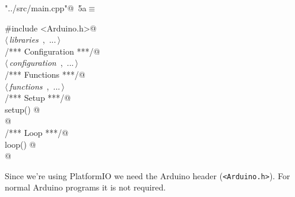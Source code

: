 \documentclass[a4paper, 11pt]{article}
\begin{document}
\begin{flushleft} \small
\begin{minipage}{\linewidth}\label{scrap1}\raggedright\small
{}\verb@"../src/main.cpp"@\nobreak\ {\footnotesize{5a}}$\equiv$
\vspace{-1ex}
\begin{list}{}{\setlength{\leftmargin}{1em}} \item
\mbox{}\lstinline@#include <Arduino.h>@\\
\mbox{}\lstinline@@$\langle\,${\itshape libraries}\ {\footnotesize {}},\ ...\,$\rangle\,$\verb@@\\
\mbox{}\lstinline@/*** Configuration ***/@\\
\mbox{}\lstinline@@$\langle\,${\itshape configuration}\ {\footnotesize {}},\ ...\,$\rangle\,$\verb@@\\
\mbox{}\lstinline@/*** Functions ***/@\\
\mbox{}\lstinline@@$\langle\,${\itshape functions}\ {\footnotesize {}},\ ...\,$\rangle\,$\verb@@\\
\mbox{}\lstinline@/*** Setup ***/@\\
\mbox{}\lstinline@void setup() @\\
\mbox{}@\\
\mbox{}\lstinline@/*** Loop ***/@\\
\mbox{}\lstinline@void loop() @\\
\mbox{}@\\
\mbox{}{\NWsep}
\end{list}
\vspace{-1ex}
\end{minipage}
\end{flushleft}

Since we're using PlatformIO we need the Arduino header (\verb|<Arduino.h>|).
For normal Arduino programs it is not required.
\end{document}
